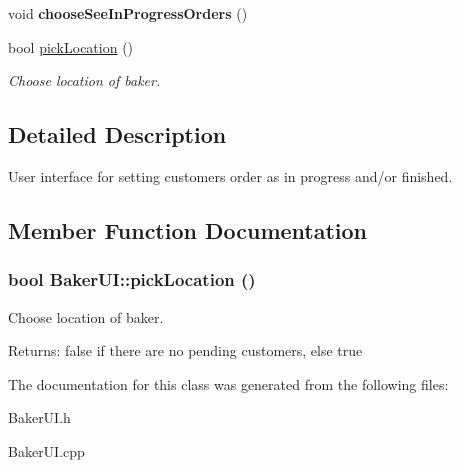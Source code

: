 \begin{CompactItemize}
\item 
\hypertarget{class_baker_u_i_8a3e4f702e7acee5575bbbc949c7fa6d}{
void {\bf choose\-See\-In\-Progress\-Orders} ()}
\label{class_baker_u_i_8a3e4f702e7acee5575bbbc949c7fa6d}

\item 
bool \hyperlink{class_baker_u_i_74d0d6b7d7493e8a9703bc8fbeb79f2e}{pick\-Location} ()
\begin{CompactList}\small\item\em Choose location of baker. \item\end{CompactList}\end{CompactItemize}


\subsection{Detailed Description}
User interface for setting customers order as in progress and/or finished. 



\subsection{Member Function Documentation}
\hypertarget{class_baker_u_i_74d0d6b7d7493e8a9703bc8fbeb79f2e}{
\subsubsection[pickLocation]{\setlength{\rightskip}{0pt plus 5cm}bool Baker\-UI::pick\-Location ()}}
\label{class_baker_u_i_74d0d6b7d7493e8a9703bc8fbeb79f2e}


Choose location of baker. 

\begin{Desc}
\item[Returns:]false if there are no pending customers, else true \end{Desc}


The documentation for this class was generated from the following files:\begin{CompactItemize}
\item 
Baker\-UI.h\item 
Baker\-UI.cpp\end{CompactItemize}

